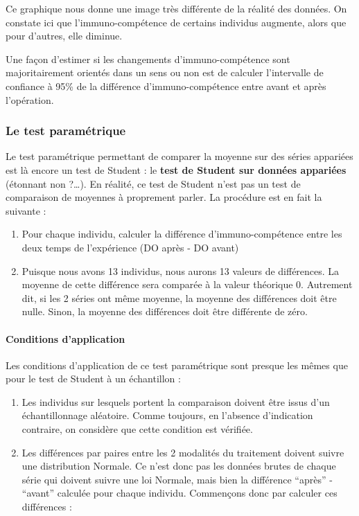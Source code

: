 \documentclass[
  a4paper,
]{article}
\providecommand{\tightlist}{%
  \setlength{\itemsep}{0pt}\setlength{\parskip}{0pt}}
\begin{document}
Ce graphique nous donne une image très différente de la réalité des données. On constate ici que l'immuno-compétence de certains individus augmente, alors que pour d'autres, elle diminue.

Une façon d'estimer si les changements d'immuno-compétence sont majoritairement orientés dans un sens ou non est de calculer l'intervalle de confiance à 95\% de la différence d'immuno-compétence entre avant et après l'opération.

\hypertarget{le-test-paramuxe9trique-1}{%
\subsubsection{Le test paramétrique}\label{le-test-paramuxe9trique-1}}

Le test paramétrique permettant de comparer la moyenne sur des séries appariées est là encore un test de Student : le \textbf{test de Student sur données appariées} (étonnant non ?\ldots). En réalité, ce test de Student n'est pas un test de comparaison de moyennes à proprement parler. La procédure est en fait la suivante :

\begin{enumerate}
\def\labelenumi{\arabic{enumi}.}
\tightlist
\item
  Pour chaque individu, calculer la différence d'immuno-compétence entre les deux temps de l'expérience (DO après - DO avant)
\item
  Puisque nous avons 13 individus, nous aurons 13 valeurs de différences. La moyenne de cette différence sera comparée à la valeur théorique 0. Autrement dit, si les 2 séries ont même moyenne, la moyenne des différences doit être nulle. Sinon, la moyenne des différences doit être différente de zéro.
\end{enumerate}

\hypertarget{conditions-dapplication-1}{%
\paragraph{Conditions d'application}\label{conditions-dapplication-1}}

Les conditions d'application de ce test paramétrique sont presque les mêmes que pour le test de Student à un échantillon :

\begin{enumerate}
\def\labelenumi{\arabic{enumi}.}
\tightlist
\item
  Les individus sur lesquels portent la comparaison doivent être issus d'un échantillonnage aléatoire. Comme toujours, en l'absence d'indication contraire, on considère que cette condition est vérifiée.
\item
  Les différences par paires entre les 2 modalités du traitement doivent suivre une distribution Normale. Ce n'est donc pas les données brutes de chaque série qui doivent suivre une loi Normale, mais bien la différence ``après'' - ``avant'' calculée pour chaque individu. Commençons donc par calculer ces différences :
\end{enumerate}
\end{document}
